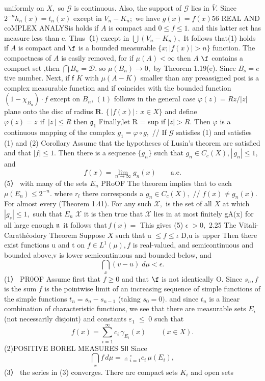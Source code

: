 uniformly on $X,$ so $\scriptstyle{\mathcal{G}}$ is continuous. Also, the support of $\scriptstyle{\mathcal{G}}$ lies in ${\bar{V}}.$ Since $2^{-n}h_{n}(x)=t_{n}(x)$ except in $V_{n}-K_{n};$ we have $g(x)=f(x)$56 REAL AND coMPLEX ANALYSis holds if $\scriptstyle A$ is compact and $0\leq f\leq1.$ and this latter set has measure less than e. Thus（1) except in $\bigcup{(V_{n}-K_{n})},$ It follows that(1) holds if $\scriptstyle A$ is compact and $\boldsymbol{\f}$ is a bounded measurable $\{x;|f(x)|>n\}$ function. The compactness of $\scriptstyle A$ is easily removed, for if $\mu(A)<\infty$ then $\scriptstyle A$ $\boldsymbol{\f}$ contains a compact set ,then $\bigcap B_{n}={\mathcal{D}}.$ so $\mu(B_{n})\to0,$ by Theorem 1.19(e). Since $\scriptstyle{B_{s}=e}$ tive number. Next, if $\boldsymbol{\mathsf{f}}$ $\textstyle K$ with $\mu(A-K)$ smaller than any preassigned posi is a complex measurable function and if coincides with the bounded function $(1-\chi_{B_{n}})\cdot f$ except on $B_{n},\,(1)$ follows in the general case $\varphi(z)=R z/|z|$ plane onto the disc of radius ${\boldsymbol{R}}.$ $\{\,|f(x)|\,:\,x\in X\}$ and define $\varphi(z)=z\,{\mathrm{~if~}}\;|z\,|\leq R$ then ${\mathfrak{g}}_{1}$ Finally,let R = sup if $|z|>R.$ Then $\varphi$ is a continuous mapping of the complex $g_{1}=\varphi\circ g,$ // If $\scriptstyle{\mathcal{G}}$ satisfies (1) and satisfies (1) and (2) Corollary Assume that the hypotheses of Lusin's theorem are satisfied and that $|f|\leq1.$ Then there is a sequence $\{g_{n}\}$ such that $g_{n}\in C_{c}(X),|\,g_{n}|\leq1,$ and $$ f(x)=\operatorname*{lim}_{n\to\infty}g_{n}(x)\qquad{\mathrm{a.e.}} $$ (5） with many of the sets $E_{n}$ PRoOF The theorem implies that to each $\mu(E_{n})\leq2^{-n}.$ where $r_{\mathit{l}}$ there corresponds a $g_{n}\in C_{c}(X),$ // $f(x)\neq g_{n}(x).$ For almost every (Theorem 1.41). For any such ${\mathcal{X}},$ is the set of all $\scriptstyle{X}$ at which $|g_{s}|\leq1,$ such that $E_{n}$ $\scriptstyle{\mathcal{X}}$ it is then true that $\scriptstyle{\mathcal{X}}$ lies in at most finitely gA(x) for all large enough ${\mathfrak{n}}\,$ it follows ${\mathrm{that}}\,f(x)=$ This gives (5) $\scriptstyle\epsilon\;>0,$ 2.25 The Vitali-Carathéodory Theorem Suppose $X$ such that u $\leq f\leq\iota$ D,u is upper Then there exist functions u and t on $f\in L^{1}(\mu),f$ is real-valued, and semicontinuous and bounded above,v is lower semicontinuous and bounded below, and $$ \bigcap_{x}(v-u)\;d\mu<\epsilon. $$ (1） PR0OF Assume first that $f\geq0$ and that $\boldsymbol{\f}$ is not identically O. Since $s_{n},f$ is the sum $\boldsymbol{\mathit{f}}$ is the pointwise limit of an increasing sequence of simple functions of the simple functions $t_{n}=s_{n}-s_{n-1}$ (taking $s_{0}=0).$ and since $t_{n}$ is a linear combination of characteristic functions, we see that there are measurable sets $E_{i}$ (not necessarily disjoint) and constants $\scriptstyle{\varepsilon_{1}\;\leq\;0}$ such that $$ f(x)=\sum_{i=1}^{\infty}c_{i}\,\gamma_{E_{i}}(x)\qquad(x\in X). $$ (2)POSITIVE BOREL MEASURES ${\mathsf{S I I}}$ Since $$ \bigcap_{x}f\,d\mu=\ \stackrel{\circ}{_\mathrm{=}}\,_{i=1}^{\circ}c_{i}\,\mu(E_{i}), $$ (3） the series in (3) converges. There are compact sets $K_{i}$ and open sets 